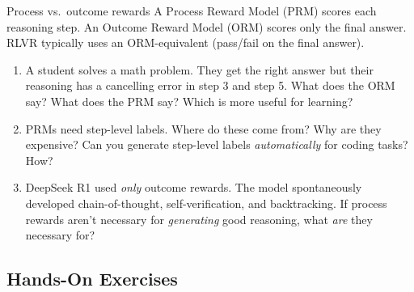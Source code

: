 \begin{thinkfirst}{Process vs.\ outcome rewards}
A Process Reward Model (PRM) scores each reasoning step. An Outcome Reward Model (ORM) scores only the final answer. RLVR typically uses an ORM-equivalent (pass/fail on the final answer).

\begin{enumerate}
  \item A student solves a math problem. They get the right answer but their reasoning has a cancelling error in step 3 and step 5. What does the ORM say? What does the PRM say? Which is more useful for learning?
  \item PRMs need step-level labels. Where do these come from? Why are they expensive? Can you generate step-level labels \textit{automatically} for coding tasks? How?
  \item DeepSeek R1 used \textit{only} outcome rewards. The model spontaneously developed chain-of-thought, self-verification, and backtracking. If process rewards aren't necessary for \textit{generating} good reasoning, what \textit{are} they necessary for?
\end{enumerate}
\end{thinkfirst}

\subsection{Hands-On Exercises}

